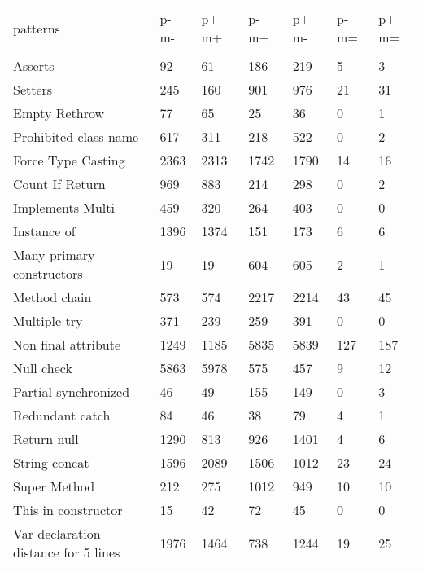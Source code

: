 \begin{table}[ht]
\footnotesize
\begin{tabular}{lllllll}
patterns                                 &   p- m-   &   p+ m+   &   p- m+   &   p+ m-   &   p- m=   &   p+ m=   \\
\\ \hline
Asserts                                	&	92	&	61	&	186	&	219	&	5	&	3	\\
Setters                                		&	245	&	160	&	901	&	976	&	21	&	31	\\
Empty Rethrow                          		&	77	&	65	&	25	&	36	&	0	&	1	\\
Prohibited class name                  		&	617	&	311	&	218	&	522	&	0	&	2	\\
Force Type Casting                     		&	2363	&	2313	&	1742	&	1790	&	14	&	16	\\
Count If Return                        		&	969	&	883	&	214	&	298	&	0	&	2	\\
Implements Multi                       		&	459	&	320	&	264	&	403	&	0	&	0	\\
Instance of                            		&	1396	&	1374	&	151	&	173	&	6	&	6	\\
Many primary constructors              		&	19	&	19	&	604	&	605	&	2	&	1	\\
Method chain                           		&	573	&	574	&	2217	&	2214	&	43	&	45	\\
Multiple try                           		&	371	&	239	&	259	&	391	&	0	&	0	\\
Non final attribute                    		&	1249	&	1185	&	5835	&	5839	&	127	&	187	\\
Null check                             		&	5863	&	5978	&	575	&	457	&	9	&	12	\\
Partial synchronized                   		&	46	&	49	&	155	&	149	&	0	&	3	\\
Redundant catch                        		&	84	&	46	&	38	&	79	&	4	&	1	\\
Return null                            		&	1290	&	813	&	926	&	1401	&	4	&	6	\\
String concat                          		&	1596	&	2089	&	1506	&	1012	&	23	&	24	\\
Super Method                           		&	212	&	275	&	1012	&	949	&	10	&	10	\\
This in constructor                    		&	15	&	42	&	72	&	45	&	0	&	0	\\
Var declaration distance for 5 lines   		&	1976	&	1464	&	738	&	1244	&	19	&	25	\\

\end{tabular}
\end{table}
